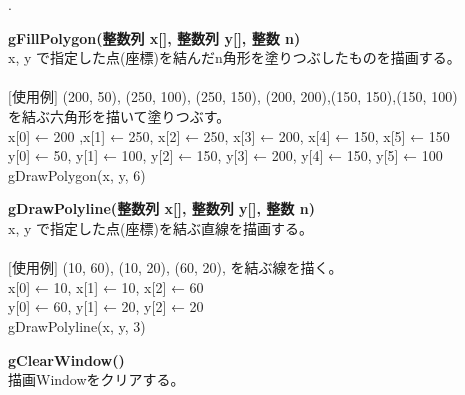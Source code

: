 \documentclass[11pt,a4j]{jarticle}
\newcounter{enum2}
\newenvironment{enumerate2}{%
   \begin{list}%
   {%
      \arabic{enum2}.\ \,%
   }%
   {%
      \usecounter{enum2}
      \setlength{\itemindent}{0zw}%
      \setlength{\leftmargin}{3zw}%
      \setlength{\rightmargin}{0zw}%
      \setlength{\labelsep}{0zw}%
      \setlength{\labelwidth}{3zw}%
      \setlength{\itemsep}{0em}%
      \setlength{\parsep}{0em}%
      \setlength{\listparindent}{0zw}%
   }
}{%
   \end{list}%
}
\begin{document}
\begin{enumerate2}
\item {\bf{gFillPolygon(整数列 x[], 整数列 y[], 整数 n)}} \\
       x, y で指定した点(座標)を結んだn角形を塗りつぶしたものを描画する。\\
\ \\
	  \hspace{10pt}  $[$使用例$]$ (200, 50), (250, 100), (250, 150), (200, 200),(150, 150),(150, 100)\\
          \hspace{55pt}  を結ぶ六角形を描いて塗りつぶす。 \\
          \hspace{55pt}    x[0] ← 200 ,x[1] ← 250, x[2] ← 250, x[3] ← 200, x[4] ← 150, x[5] ← 150 \\
          \hspace{55pt}    y[0] ← 50, y[1] ← 100, y[2] ← 150, y[3] ← 200, y[4] ← 150, y[5] ← 100 \\ 
          \hspace{55pt}    gDrawPolygon(x, y, 6) \\

\item {\bf{gDrawPolyline(整数列 x[], 整数列 y[], 整数 n)}} \\
       x, y で指定した点(座標)を結ぶ直線を描画する。\\
\ \\
	  \hspace{10pt}  $[$使用例$]$ (10, 60), (10, 20), (60, 20), を結ぶ線を描く。 \\
          \hspace{55pt}    x[0] ← 10, x[1] ← 10, x[2] ← 60 \\
          \hspace{55pt}    y[0] ← 60, y[1] ← 20, y[2] ← 20 \\
          \hspace{55pt}    gDrawPolyline(x, y, 3) \\


\item {\bf{gClearWindow()}} \\
       描画Windowをクリアする。
\end{enumerate2}

\newpage
\end{document}
